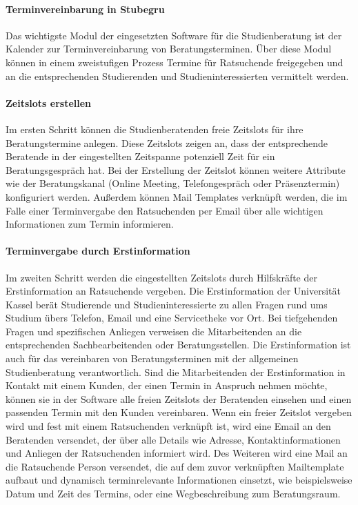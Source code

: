 \documentclass[12pt]{article}
\begin{document}
\paragraph{Terminvereinbarung in Stubegru}
Das wichtigste Modul der eingesetzten Software für die Studienberatung ist der
Kalender zur Terminvereinbarung von Beratungsterminen. Über diese Modul können
in einem zweistufigen Prozess Termine für Ratsuchende freigegeben und an die
entsprechenden Studierenden und Studieninteressierten vermittelt werden.

\paragraph{Zeitslots erstellen}
Im ersten Schritt können die Studienberatenden freie Zeitslots für ihre
Beratungstermine anlegen. Diese Zeitslots zeigen an, dass der entsprechende
Beratende in der eingestellten Zeitspanne potenziell Zeit für ein
Beratungsgespräch hat. Bei der Erstellung der Zeitslot können weitere Attribute
wie der Beratungskanal (Online Meeting, Telefongespräch oder Präsenztermin)
konfiguriert werden. Außerdem können Mail Templates verknüpft werden, die im
Falle einer Terminvergabe den Ratsuchenden per Email über alle wichtigen
Informationen zum Termin informieren.

\paragraph{Terminvergabe durch Erstinformation}
Im zweiten Schritt werden die eingestellten Zeitslots durch Hilfskräfte der
Erstinformation an Ratsuchende vergeben. Die Erstinformation der Universität
Kassel berät Studierende und Studieninteressierte zu allen Fragen rund ums
Studium übers Telefon, Email und eine Servicetheke vor Ort. Bei tiefgehenden
Fragen und spezifischen Anliegen verweisen die Mitarbeitenden an die
entsprechenden Sachbearbeitenden oder Beratungsstellen. Die Erstinformation ist
auch für das vereinbaren von Beratungsterminen mit der allgemeinen
Studienberatung verantwortlich. Sind die Mitarbeitenden der Erstinformation in
Kontakt mit einem Kunden, der einen Termin in Anspruch nehmen möchte, können
sie in der Software alle freien Zeitslots der Beratenden einsehen und einen
passenden Termin mit den Kunden vereinbaren. Wenn ein freier Zeitslot vergeben
wird und fest mit einem Ratsuchenden verknüpft ist, wird eine Email an den
Beratenden versendet, der über alle Details wie Adresse, Kontaktinformationen
und Anliegen der Ratsuchenden informiert wird. Des Weiteren wird eine Mail an
die Ratsuchende Person versendet, die auf dem zuvor verknüpften Mailtemplate
aufbaut und dynamisch terminrelevante Informationen einsetzt, wie
beispielsweise Datum und Zeit des Termins, oder eine Wegbeschreibung zum
Beratungsraum.
\end{document}
